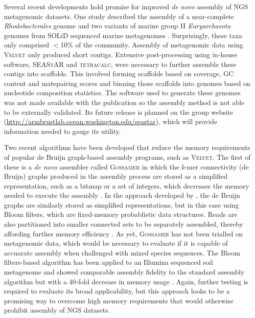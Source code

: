 Several recent developments hold promise for improved \emph{de} \emph{novo} assembly of \ac{NGS} metagenomic datasets.
One study described the assembly of a near-complete \emph{Rhodobacterales} genome and two variants of marine group II \emph{Euryarchaeota} genomes from SOLiD sequenced marine metagenomes \cite{Iverson2012}.
Surprisingly, these taxa only comprised $<$10\% of the community.
Assembly of metagenomic data using \textsc{Velvet} only produced short contigs.
Extensive post-processing using in-house software, \textsc{SEAStAR} and \textsc{tetracalc}, were necessary to further assemble these contigs into scaffolds.
This involved forming scaffolds based on coverage, GC content and matepairing scores and binning those scaffolds into genomes based on nucleotide composition statistics.
The software used to generate these genomes was not made available with the publication so the assembly method is not able to be externally validated.
Its future release is planned on the group website 
(\url{http://armbrustlab.ocean.washington.edu/seastar}), which will provide information needed to gauge its utility.

Two recent algorithms have been developed \cite{Conway2012, Pell2012} that reduce the memory requirements of popular de Bruijn graph-based assembly programs, such as \textsc{Velvet}.
The first of these is a \emph{de novo} assembler called \textsc{Gossamer} in which the \emph{k}-mer connectivity (de Bruijn) graphs produced in the assembly process are stored as a simplified representation, such as a bitmap or a set of integers, which decreases the memory needed to execute the assembly \cite{Conway2012}.
In the approach developed by \citet{Pell2012}, the de Bruijn graphs are similarly stored as simplified representations, but in this case using Bloom filters, which are fixed-memory probablistic data structures.
Reads are also partitioned into smaller connected sets to be separately assembled, thereby affording further memory efficiency \cite{Pell2012}.
As yet, \textsc{Gossamer} has not been trialled on metagenomic data, which would be necessary to evaluate if it is capable of accuarate assembly when challenged with mixed species sequences.
The Bloom filters-based algorithm has been applied to an Illumina sequenced soil metagenome and showed comparable assembly fidelity to the standard assembly algorithm but with a 40-fold decrease in memory usage \cite{Pell2012}.
Again, further testing is required to evaluate its broad applicability, but this approach looks to be a promising way to overcome high memory requirements that would otherwise prohibit assembly of \ac{NGS} datasets.

